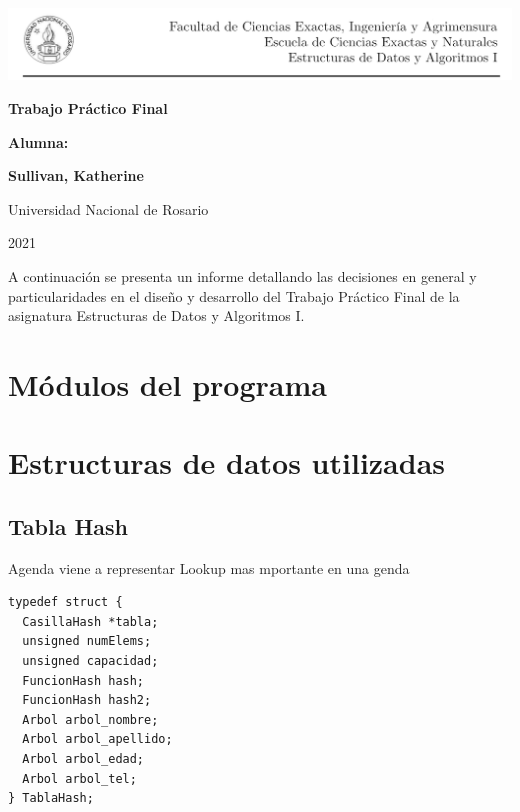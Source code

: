 \documentclass[11pt]{article}
\begin{document}
\begin{titlepage}
    \vspace{-1cm}
    \hspace{-1.2cm}\includegraphics[scale= 0.8]{header2.png}
    \begin{center}
        \vfill
        \vfill
            \vspace{0.7cm}
            \noindent\textbf{\Huge Trabajo Práctico Final}\par
            \vspace{.5cm}
        \vfill
        \noindent \textbf{\huge Alumna:}\par
        \vspace{.5cm}
        \noindent \textbf{\Large Sullivan, Katherine}\par
 
        \vfill
        \large Universidad Nacional de Rosario \par
        \noindent\large 2021
    \end{center}
\end{titlepage}

A continuaci\'on se presenta un informe detallando las decisiones en general y particularidades en el dise\~{n}o y desarrollo 
del Trabajo Pr\'actico Final de la asignatura Estructuras de Datos y Algoritmos I. 

\section{M\'odulos del programa}

\section{Estructuras de datos utilizadas}

\subsection{Tabla Hash}
Agenda viene a representar
Lookup mas mportante en una genda

\begin{lstlisting}[style = CStyle]
typedef struct {
  CasillaHash *tabla;
  unsigned numElems;
  unsigned capacidad;
  FuncionHash hash;
  FuncionHash hash2;
  Arbol arbol_nombre;
  Arbol arbol_apellido;
  Arbol arbol_edad;
  Arbol arbol_tel;
} TablaHash;
\end{lstlisting}
\end{document}
